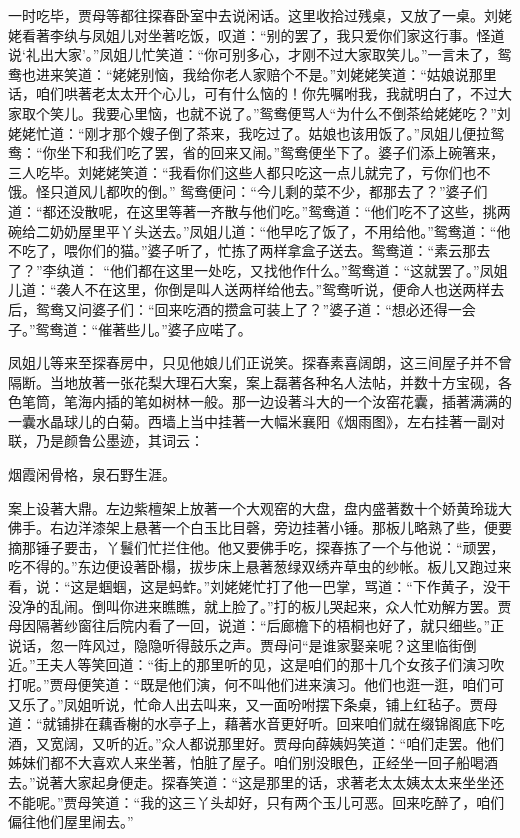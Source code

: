 \begin{parag}
    一时吃毕，贾母等都往探春卧室中去说闲话。这里收拾过残桌，又放了一桌。刘姥姥看著李纨与凤姐儿对坐著吃饭，叹道：“别的罢了，我只爱你们家这行事。怪道说‘礼出大家’。”凤姐儿忙笑道：“你可别多心，才刚不过大家取笑儿。”一言未了，鸳鸯也进来笑道：“姥姥别恼，我给你老人家赔个不是。”刘姥姥笑道：“姑娘说那里话，咱们哄著老太太开个心儿，可有什么恼的！你先嘱咐我，我就明白了，不过大家取个笑儿。我要心里恼，也就不说了。”鸳鸯便骂人“为什么不倒茶给姥姥吃？”刘姥姥忙道：“刚才那个嫂子倒了茶来，我吃过了。姑娘也该用饭了。”凤姐儿便拉鸳鸯：“你坐下和我们吃了罢，省的回来又闹。”鸳鸯便坐下了。婆子们添上碗箸来，三人吃毕。刘姥姥笑道：“我看你们这些人都只吃这一点儿就完了，亏你们也不饿。怪只道风儿都吹的倒。” 鸳鸯便问：“今儿剩的菜不少，都那去了？”婆子们道：“都还没散呢，在这里等著一齐散与他们吃。”鸳鸯道：“他们吃不了这些，挑两碗给二奶奶屋里平丫头送去。”凤姐儿道：“他早吃了饭了，不用给他。”鸳鸯道：“他不吃了，喂你们的猫。”婆子听了，忙拣了两样拿盒子送去。鸳鸯道：“素云那去了？”李纨道： “他们都在这里一处吃，又找他作什么。”鸳鸯道：“这就罢了。”凤姐儿道：“袭人不在这里，你倒是叫人送两样给他去。”鸳鸯听说，便命人也送两样去后，鸳鸯又问婆子们：“回来吃酒的攒盒可装上了？”婆子道：“想必还得一会子。”鸳鸯道：“催著些儿。”婆子应喏了。
\end{parag}


\begin{parag}
    凤姐儿等来至探春房中，只见他娘儿们正说笑。探春素喜阔朗，这三间屋子并不曾隔断。当地放著一张花梨大理石大案，案上磊著各种名人法帖，并数十方宝砚，各色笔筒，笔海内插的笔如树林一般。那一边设著斗大的一个汝窑花囊，插著满满的一囊水晶球儿的白菊。西墙上当中挂著一大幅米襄阳《烟雨图》，左右挂著一副对联，乃是颜鲁公墨迹，其词云：
\end{parag}


\begin{poem}
    \begin{pl}烟霞闲骨格，泉石野生涯。\end{pl}
\end{poem}


\begin{parag}
    案上设著大鼎。左边紫檀架上放著一个大观窑的大盘，盘内盛著数十个娇黄玲珑大佛手。右边洋漆架上悬著一个白玉比目磬，旁边挂著小锤。那板儿略熟了些，便要摘那锤子要击，丫鬟们忙拦住他。他又要佛手吃，探春拣了一个与他说：“顽罢，吃不得的。”东边便设著卧榻，拔步床上悬著葱绿双绣卉草虫的纱帐。板儿又跑过来看，说：“这是蝈蝈，这是蚂蚱。”刘姥姥忙打了他一巴掌，骂道：“下作黄子，没干没净的乱闹。倒叫你进来瞧瞧，就上脸了。”打的板儿哭起来，众人忙劝解方罢。贾母因隔著纱窗往后院内看了一回，说道：“后廊檐下的梧桐也好了，就只细些。”正说话，忽一阵风过，隐隐听得鼓乐之声。贾母问“是谁家娶亲呢？这里临街倒近。”王夫人等笑回道：“街上的那里听的见，这是咱们的那十几个女孩子们演习吹打呢。”贾母便笑道：“既是他们演，何不叫他们进来演习。他们也逛一逛，咱们可又乐了。”凤姐听说，忙命人出去叫来，又一面吩咐摆下条桌，铺上红毡子。贾母道：“就铺排在藕香榭的水亭子上，藉著水音更好听。回来咱们就在缀锦阁底下吃酒，又宽阔，又听的近。”众人都说那里好。贾母向薛姨妈笑道：“咱们走罢。他们姊妹们都不大喜欢人来坐著，怕脏了屋子。咱们别没眼色，正经坐一回子船喝酒去。”说著大家起身便走。探春笑道：“这是那里的话，求著老太太姨太太来坐坐还不能呢。”贾母笑道：“我的这三丫头却好，只有两个玉儿可恶。回来吃醉了，咱们偏往他们屋里闹去。”
\end{parag}


